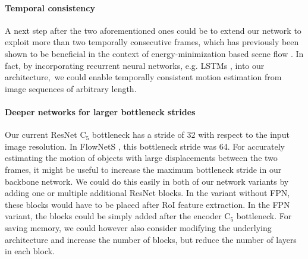 \paragraph{Temporal consistency}
A next step after the two aforementioned ones could be to extend our network to exploit more than two
temporally consecutive frames, which has previously been shown to be beneficial in the
context of energy-minimization based scene flow \cite{TemporalSF}.
In fact, by incorporating recurrent neural networks, e.g. LSTMs \cite{LSTM},
into our architecture, we could enable temporally consistent motion estimation
from image sequences of arbitrary length.

\paragraph{Deeper networks for larger bottleneck strides}
Our current ResNet C$_5$ bottleneck has a stride of 32 with respect to the
input image resolution. In FlowNetS \cite{FlowNet}, this bottleneck stride was 64.
For accurately estimating the motion of objects with large displacements between
the two frames, it might be useful to increase the maximum bottleneck stride in our backbone network.
We could do this easily in both of our network variants by adding one or multiple additional
ResNet blocks. In the variant without FPN, these blocks would have to be placed
after RoI feature extraction. In the FPN variant, the blocks could be simply
added after the encoder C$_5$ bottleneck.
For saving memory, we could however also consider modifying the underlying
 architecture and increase the number of blocks, but reduce the number
of layers in each block.
